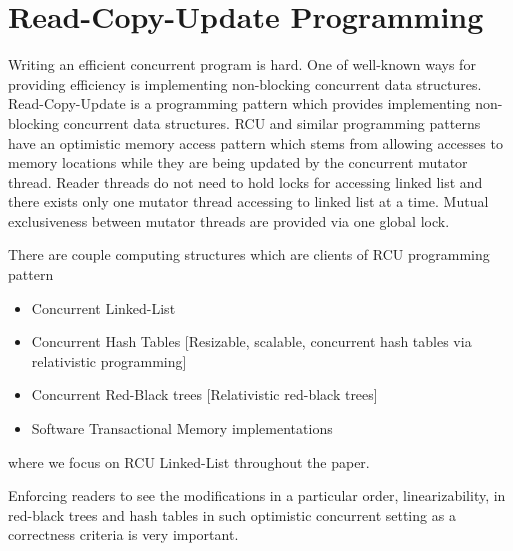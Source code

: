 \section{Read-Copy-Update Programming}
Writing an efficient concurrent program is hard. One of well-known ways for providing efficiency is implementing non-blocking concurrent data structures. \textsf{Read-Copy-Update} is a programming pattern which provides implementing non-blocking concurrent data structures.
RCU and similar programming patterns have an optimistic memory access pattern which stems from allowing accesses to memory locations while they are being updated by the concurrent mutator thread. Reader threads do not need to hold locks for accessing linked list and there exists only one mutator thread accessing to linked list at a time. Mutual exclusiveness between mutator threads are provided via one global lock.

There are couple computing structures which are clients of RCU programming pattern
\begin{itemize}
\item Concurrent Linked-List
\item Concurrent Hash Tables [Resizable, scalable, concurrent hash tables via relativistic programming]
\item Concurrent Red-Black trees [Relativistic red-black trees]
\item Software Transactional Memory implementations
\end{itemize}
where we focus on RCU Linked-List throughout the paper.

Enforcing readers to see the modifications in a particular order, linearizability,  in red-black trees and hash tables in such optimistic concurrent setting as a correctness criteria is very important. 
